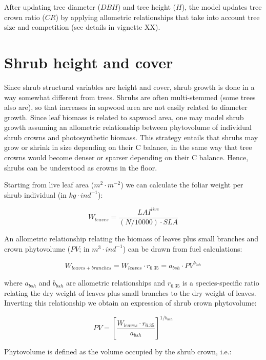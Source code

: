 \documentclass[]{book}
\begin{document}
After updating tree diameter (\(DBH\)) and tree height (\(H\)), the
model updates tree crown ratio (\(CR\)) by applying allometric
relationships that take into account tree size and competition (see
details in vignette XX).

\section{Shrub height and cover}\label{shrub-height-and-cover}

Since shrub structural variables are height and cover, shrub growth is
done in a way somewhat different from trees. Shrubs are often
multi-stemmed (some trees also are), so that increases in sapwood area
are not easily related to diameter growth. Since leaf biomass is related
to sapwood area, one may model shrub growth assuming an allometric
relationship between phytovolume of individual shrub crowns and
photosynthetic biomass. This strategy entails that shrubs may grow or
shrink in size depending on their C balance, in the same way that tree
crowns would become denser or sparser depending on their C balance.
Hence, shrubs can be understood as crowns in the floor.

Starting from live leaf area (\(m^2·m^{-2}\)) we can calculate the
foliar weight per shrub individual (in \(kg · ind^{-1}\)):

\begin{equation}
W_{leaves} = \frac{LAI^{live}} {(N/10000) \cdot SLA}
\end{equation}

An allometric relationship relating the biomass of leaves plus small
branches and crown phytovolume (\(PV\); in \(m^3·ind^{-1}\)) can be
drawn from fuel calculations:

\begin{equation}
W_{leaves+branches} = W_{leaves} \cdot r_{6.35}  = a_{bsh} \cdot PV^{b_{bsh}}
\end{equation}

where \(a_{bsh}\) and \(b_{bsh}\) are allometric relationships and
\(r_{6.35}\) is a species-specific ratio relating the dry weight of
leaves plus small branches to the dry weight of leaves. Inverting this
relationship we obtain an expression of shrub crown phytovolume:

\begin{equation}
PV = \left[\frac{W_{leaves} \cdot r_{6.35}}{a_{bsh}}\right]^{1/b_{bsh}}
\end{equation}

Phytovolume is defined as the volume occupied by the shrub crown, i.e.:
\end{document}
